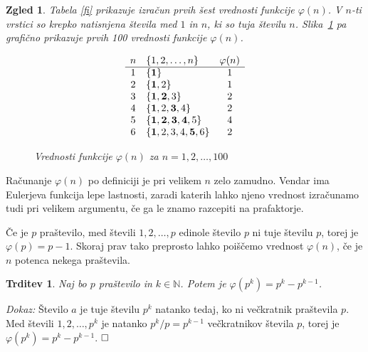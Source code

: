 \documentclass[a4paper,12pt]{article}
\def\N{\mathbb{N}} %
\def\qed{$\hfill\Box$}   %
\newtheorem{trditev}{Trditev}
\newtheorem{zgled}{Zgled}
\begin{document}
\begin{zgled}
Tabela \ref{fi} prikazuje izračun prvih šest vrednosti funkcije $\varphi(n)$. V $n$-ti vrstici so 
krepko natisnjena števila med $1$ in $n$, ki so tuja številu $n$. Slika~\ref{fi100} pa grafično prikazuje prvih 100 vrednosti funkcije $\varphi(n)$.
\begin{table}[h]
\[
\begin{array}{clc}
 n & \{1,2,\ldots, n\}          & \varphi(n)       \\
 \hline
 1 & \{{\bf 1}\}                    &     1      \\
 2 & \{{\bf 1},2 \}                &     1      \\
 3 & \{{\bf 1,2},3 \}             &     2      \\
 4 & \{{\bf 1},2,{\bf 3},4 \} &     2      \\
 5 & \{{\bf 1,2,3,4},5 \}       &     4      \\
 6 & \{{\bf 1},2,3,4,{\bf 5},6 \} &     2
\end{array}
\] 
\caption{Vrednosti funkcije $\varphi(n)$ za $n = 1,2,\ldots,6$}\label{fi}
\end{table}

\begin{figure}[h]
\caption{Vrednosti funkcije $\varphi(n)$ za $n = 1,2,\ldots,100$}\label{fi100}
\end{figure}
\end{zgled}

Računanje $\varphi(n)$ po definiciji je pri velikem $n$ zelo zamudno. Vendar ima 
Eulerjeva funkcija lepe lastnosti, zaradi katerih lahko njeno vrednost izračunamo
tudi pri velikem argumentu, če ga le znamo razcepiti na prafaktorje.

Če je $p$ praštevilo, med števili $1,2,\ldots, p$ edinole število $p$ ni tuje številu $p$,
torej je $\varphi(p) = p-1$. Skoraj prav tako preprosto lahko poiščemo vrednost $\varphi(n)$,
če je $n$ potenca nekega praštevila.

\begin{trditev}
\label{fipp}
Naj bo $p$ praštevilo in $k \in \N$. Potem je $\varphi(p^k) = p^k-p^{k-1}$.
\end{trditev}

\noindent
{\em Dokaz:\/} Število $a$ je tuje številu $p^k$ natanko tedaj, ko ni večkratnik praštevila $p$.
Med števili $1,2,\ldots, p^k$ je natanko $p^k/p = p^{k-1}$ večkratnikov števila $p$, torej je $\varphi(p^k) = p^k-p^{k-1}$. 
\qed
\end{document}
